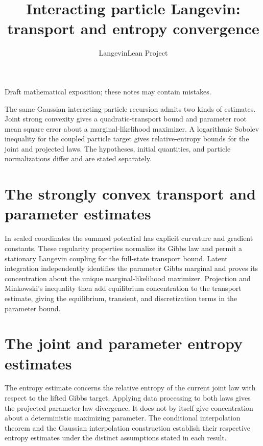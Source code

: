 \documentclass[11pt,a4paper]{article}
\title{\texorpdfstring{Interacting particle Langevin: transport and entropy convergence}{Interacting particle Langevin: transport and entropy convergence}}
\author{LangevinLean Project}
\date{}
\begin{document}
\maketitle
Draft mathematical exposition; these notes may contain mistakes.


The same Gaussian interacting-particle recursion admits two kinds of estimates. Joint strong convexity gives a quadratic-transport bound and parameter root mean square error about a marginal-likelihood maximizer. A logarithmic Sobolev inequality for the coupled particle target gives relative-entropy bounds for the joint and projected laws. The hypotheses, initial quantities, and particle normalizations differ and are stated separately.



\section{\texorpdfstring{The strongly convex transport and parameter estimates}{The strongly convex transport and parameter estimates}}


In scaled coordinates the summed potential has explicit curvature and gradient constants. These regularity properties normalize its Gibbs law and permit a stationary Langevin coupling for the full-state transport bound. Latent integration independently identifies the parameter Gibbs marginal and proves its concentration about the unique marginal-likelihood maximizer. Projection and Minkowski’s inequality then add equilibrium concentration to the transport estimate, giving the equilibrium, transient, and discretization terms in the parameter bound.




\section{\texorpdfstring{The joint and parameter entropy estimates}{The joint and parameter entropy estimates}}


The entropy estimate concerns the relative entropy of the current joint law with respect to the lifted Gibbs target. Applying data processing to both laws gives the projected parameter-law divergence. It does not by itself give concentration about a deterministic maximizing parameter. The conditional interpolation theorem and the Gaussian interpolation construction establish their respective entropy estimates under the distinct assumptions stated in each result.
\end{document}
